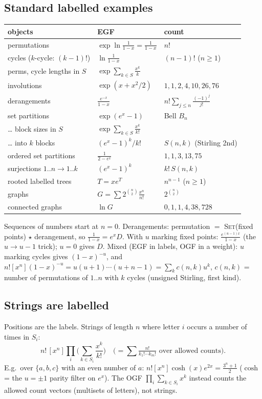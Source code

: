 	\subsection{Standard labelled examples}
	\begin{center}\small\renewcommand{\arraystretch}{1.3}
	\begin{tabular}{@{}L{3.1cm}@{\ \ }l@{\ \ }l@{}}
	objects & EGF & count \\ \hline
	permutations & $\exp\ln\frac1{1-x}=\frac1{1-x}$ & $n!$ \\
	cycles ($k$-cycle: $(k-1)!$) & $\ln\frac1{1-x}$ & $(n-1)!$ ($n\ge1$) \\
	perms, cycle lengths in $S$ & $\exp\sum_{k\in S}\frac{x^k}k$ & \\
	involutions & $\exp(x+x^2/2)$ & $1,1,2,4,10,26,76$ \\
	derangements & $\frac{e^{-x}}{1-x}$ & $n!\sum_{j\le n}\frac{(-1)^j}{j!}$ \\
	set partitions & $\exp(e^x-1)$ & Bell $B_n$ \\
	\ldots{} block sizes in $S$ & $\exp\sum_{k\in S}\frac{x^k}{k!}$ & \\
	\ldots{} into $k$ blocks & $(e^x-1)^k/k!$ & $S(n,k)$ (Stirling 2nd) \\
	ordered set partitions & $\frac1{2-e^x}$ & $1,1,3,13,75$ \\
	surjections $1..n\to1..k$ & $(e^x-1)^k$ & $k!\,S(n,k)$ \\
	rooted labelled trees & $T=xe^T$ & $n^{n-1}$ ($n\ge1$) \\
	graphs & $G=\sum2^{\binom n2}\frac{x^n}{n!}$ & $2^{\binom n2}$ \\
	connected graphs & $\ln G$ & $0,1,1,4,38,728$ \\
	\end{tabular}
	\end{center}
	Sequences of numbers start at $n=0$. Derangements: permutation $=$ \textsc{Set}(fixed points) $\star$ derangement, so $\frac1{1-x}=e^xD$. With $u$ marking fixed points: $\frac{e^{(u-1)x}}{1-x}$ (the $u\to u-1$ trick); $u=0$ gives $D$.
	Mixed (EGF in labels, OGF in a weight): $u$ marking cycles gives $(1-x)^{-u}$, and $n![x^n](1-x)^{-u}=u(u+1)\cdots(u+n-1)=\sum_kc(n,k)u^k$, $c(n,k)$ = number of permutations of $1..n$ with $k$ cycles (unsigned Stirling, first kind).

	\subsection{Strings are labelled}
	Positions are the labels. Strings of length $n$ where letter $i$ occurs a number of times in $S_i$:
	\[n!\,[x^n]\prod_i\Big(\sum_{k\in S_i}\frac{x^k}{k!}\Big)\quad\Big(=\sum\tfrac{n!}{k_1!\cdots k_m!}\text{ over allowed counts}\Big).\]
	E.g.\ over $\{a,b,c\}$ with an even number of $a$: $n![x^n]\cosh(x)e^{2x}=\frac{3^n+1}2$ ($\cosh$ = the $u=\pm1$ parity filter on $e^x$). The OGF $\prod_i\sum_{k\in S_i}x^k$ instead counts the allowed count vectors (multisets of letters), not strings.

